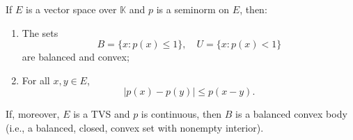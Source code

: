If $E$ is a vector space over $\mathbb{K}$ and $p$ is a seminorm on $E$, then:
\begin{enumerate}
\item[(i)] The sets
$$B = \{x : p(x) \leq 1\}, \quad U = \{x : p(x) < 1\}$$
are balanced and convex;
\item[(ii)] For all $x, y \in E$,
$$|p(x) - p(y)| \leq p(x - y).$$
\end{enumerate}
If, moreover, $E$ is a TVS and $p$ is continuous, then $B$ is a balanced convex body (i.e., a balanced, closed, convex set with nonempty interior).
